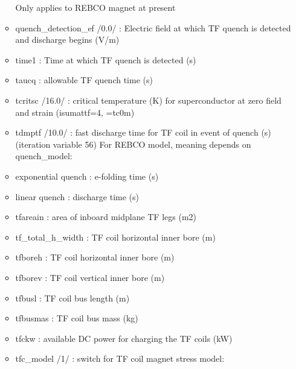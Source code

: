 \documentclass[]{article}
\begin{document}
\begin{itemize}
\begin{itemize}
    Only applies to REBCO magnet at present
  \item
    quench\_detection\_ef /0.0/ : Electric field at which TF quench is
    detected and discharge begins (V/m)
  \item
    time1 : Time at which TF quench is detected (s)
  \item
    taucq : allowable TF quench time (s)
  \item
    tcritsc /16.0/ : critical temperature (K) for superconductor at zero
    field and strain (isumattf=4, =tc0m)
  \item
    tdmptf /10.0/ : fast discharge time for TF coil in event of quench
    (s) (iteration variable 56) For REBCO model, meaning depends on
    quench\_model:
  \item
    exponential quench : e-folding time (s)
  \item
    linear quench : discharge time (s)
  \item
    tfareain : area of inboard midplane TF legs (m2)
  \item
    tf_total_h_width : TF coil horizontal inner bore (m)
  \item
    tfboreh : TF coil horizontal inner bore (m)
  \item
    tfborev : TF coil vertical inner bore (m)
  \item
    tfbusl : TF coil bus length (m)
  \item
    tfbusmas : TF coil bus mass (kg)
  \item
    tfckw : available DC power for charging the TF coils (kW)
  \item
    tfc\_model /1/ : switch for TF coil magnet stress model:


\end{itemize}
\end{itemize}
\end{document}
